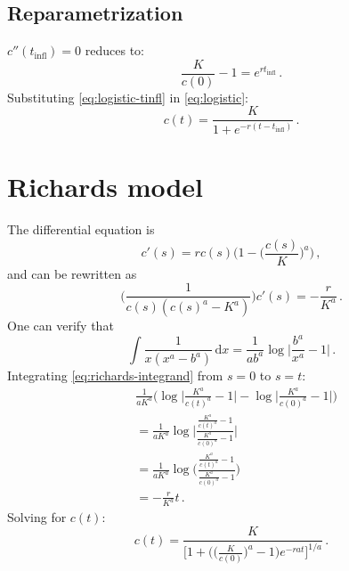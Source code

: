 \documentclass[12pt]{article}
\begin{document}
\subsection{Reparametrization}

$c''(t_\text{infl}) = 0$ reduces to:
%
\begin{equation}
  \label{eq:logistic-tinfl}
  \frac{K}{c(0)} - 1 = e^{r t_\text{infl}}\,.
\end{equation}
%
Substituting \eqref{eq:logistic-tinfl} in \eqref{eq:logistic}:
%
\begin{equation}
  c(t) = \frac{K}{1 + e^{-r (t - t_\text{infl})}}\,.
\end{equation}

\section{Richards model}

The differential equation is
%
\begin{equation}
  c'(s) = r c(s) \bigg(1 - \bigg(\frac{c(s)}{K}\bigg)^a\bigg)\,,
\end{equation}
%
and can be rewritten as
%
\begin{equation}
  \label{eq:richards-integrand}
  \bigg(\frac{1}{c(s) (c(s)^a - K^a)}\bigg) c'(s) = -\frac{r}{K^a}\,.
\end{equation}
%
One can verify that
%
\begin{equation}
  \int \frac{1}{x (x^a - b^a)}\,\text{d}x = \frac{1}{a b^a} \log\bigg|\frac{b^a}{x^a} - 1\bigg|\,.
\end{equation}
%
Integrating \eqref{eq:richards-integrand} from $s = 0$ to $s = t$:
%
\begin{equation}
  \begin{aligned}
    &\frac{1}{a K^a} \Bigg(\log\bigg|\frac{K^a}{c(t)^a} - 1\bigg| - \log\bigg|\frac{K^a}{c(0)^a} - 1\bigg|\Bigg) \\
    &= \frac{1}{a K^a} \log\Bigg|\frac{\frac{K^a}{c(t)^a} - 1}{\frac{K^a}{c(0)^a} - 1}\Bigg| \\
    &= \frac{1}{a K^a} \log\Bigg(\frac{\frac{K^a}{c(t)^a} - 1}{\frac{K^a}{c(0)^a} - 1}\Bigg) \\
    &= -\frac{r}{K^a}t\,.
  \end{aligned}
\end{equation}
%
Solving for $c(t)$:
%
\begin{equation}
  \label{eq:richards}
  c(t) = \frac{K}{\big[1 + \big(\big(\frac{K}{c(0)}\big)^a - 1\big) e^{-r a t}\big]^{1/a}}\,.
\end{equation}
\end{document}
